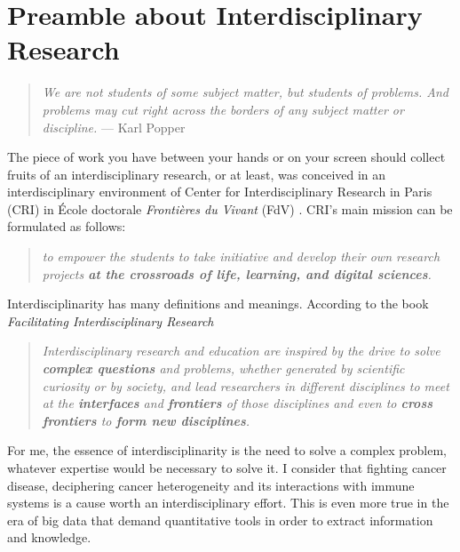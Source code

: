 \documentclass[12pt,]{book}
\theoremstyle{definition}
\theoremstyle{definition}
\theoremstyle{definition}
\theoremstyle{remark}
\begin{document}
{
\hypersetup{linkcolor=black}
\setcounter{tocdepth}{4}
\tableofcontents
}
\hypersetup{linkcolor=black}
\listoftables

\hypersetup{linkcolor=black}
\listoffigures
\hypertarget{preamble-about-interdisciplinary-research}{%
\chapter*{Preamble about Interdisciplinary
Research}\label{preamble-about-interdisciplinary-research}}

\setcounter{page}{15}

\begin{quote}
\emph{We are not students of some subject matter, but students of
problems. And problems may cut right across the borders of any subject
matter or discipline.} --- Karl Popper
\end{quote}

The piece of work you have between your hands or on your screen should
collect fruits of an interdisciplinary research, or at least, was
conceived in an interdisciplinary environment of Center for
Interdisciplinary Research in Paris (CRI) in École doctorale
\emph{Frontières du Vivant} (FdV) . CRI's main mission can be formulated
as follows:

\begin{quote}
\emph{to empower the students to take initiative and develop their own
research projects \textbf{at the crossroads of life, learning, and
digital sciences}.} \citep{CRIweb}
\end{quote}

Interdisciplinarity has many definitions and meanings. According to the
book \emph{Facilitating Interdisciplinary Research} \citep{FIRbook}

\begin{quote}
\emph{Interdisciplinary research and education are inspired by the drive
to solve \textbf{complex questions} and problems, whether generated by
scientific curiosity or by society, and lead researchers in different
disciplines to meet at the \textbf{interfaces} and \textbf{frontiers} of
those disciplines and even to \textbf{cross frontiers} to \textbf{form
new disciplines}.}
\end{quote}

For me, the essence of interdisciplinarity is the need to solve a
complex problem, whatever expertise would be necessary to solve it. I
consider that fighting cancer disease, deciphering cancer heterogeneity
and its interactions with immune systems is a cause worth an
interdisciplinary effort. This is even more true in the era of big data
that demand quantitative tools in order to extract information and
knowledge.
\end{document}
